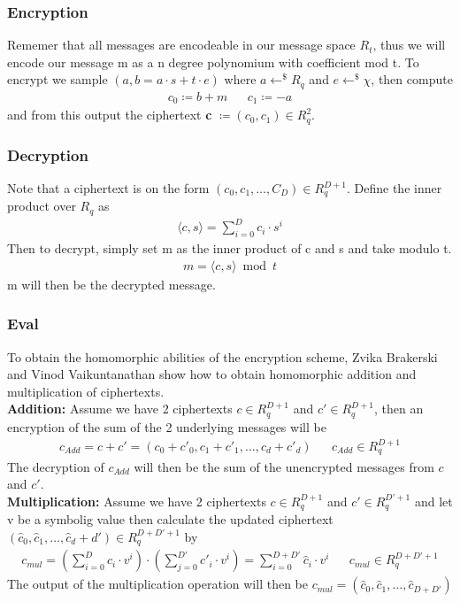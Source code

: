 \documentclass[../main.tex]{subfiles}
\begin{document}
\subsubsection{Encryption}
Rememer that all messages are encodeable in our message space $R_t$, thus we will encode our message m as a n degree
polynomium with coefficient mod t.
To encrypt we sample $(a, b = a \cdot s + t \cdot e)$ where $a \leftarrow^\$ R_q$ and $e \leftarrow^\$ \chi$,
then compute
\begin{align*}
    c_0 \coloneqq b + m &  & c_1 \coloneqq -a
\end{align*}
and from this output the ciphertext \textbf{c} $\coloneqq (c_0, c_1) \in R_q^2$.

\subsubsection{Decryption}
Note that a ciphertext is on the form $(c_0, c_1, \dots , C_{D}) \in R_q^{D+1}$.
Define the inner product over $R_q$ as
\begin{align*}
    \langle c, s \rangle = \sum_{i=0}^{D} c_i \cdot s^i
\end{align*}
Then to decrypt, simply set m as the inner product of c and s and take modulo t.
\begin{align*}
    m = \langle c, s \rangle \bmod t
\end{align*}
m will then be the decrypted message.

\subsubsection{Eval}
To obtain the homomorphic abilities of the encryption scheme, Zvika Brakerski and Vinod Vaikuntanathan show
how to obtain homomorphic addition and multiplication of ciphertexts.
\\[2mm]
\textbf{Addition:} Assume we have 2 ciphertexts $c \in R_q^{D+1}$ and $c' \in R_q^{D+1}$, then an encryption
of the sum of the 2 underlying messages will be
\begin{align*}
    c_{Add} = c + c' = (c_0 + c'_0, c_1 + c'_1, \dots , c_d + c'_d) &  & c_{Add} \in R_q^{D + 1}
\end{align*}
The decryption of $c_{Add}$ will then be the sum of the unencrypted messages from $c$ and $c'$.
\\[2mm]
\textbf{Multiplication:} Assume we have 2 ciphertexts $c \in R_q^{D+1}$ and $c' \in R_q^{D'+1}$ and let v be a symbolig value
then calculate the updated ciphertext
\\
$(\hat{c}_0, \hat{c}_1, \dots, \hat{c}_d+d') \in R_q^{D + D' + 1}$ by
\begin{align*}
    c_{mul} = (\sum_{i=0}^D c_i \cdot v^i) \cdot
    (\sum_{j=0}^{D'} c'_i \cdot v^i) =
    \sum_{i=0}^{D+D'} \hat{c}_i \cdot v^i
     &  & c_{mul} \in R_q^{D+D'+1}
\end{align*}
The output of the multiplication operation will then be $c_{mul} = (\hat{c}_0, \hat{c}_1, \dots, \hat{c}_{D+D'})$
\end{document}
